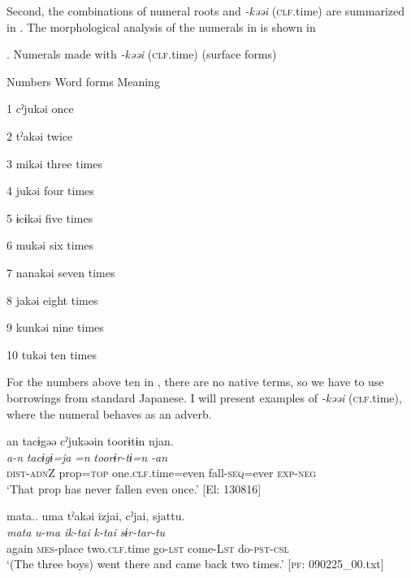 Second, the combinations of numeral roots and \textit{{}-kəəi} (\textsc{clf}.time) are summarized in . The morphological analysis of the numerals in  is shown in 

\begin{styleBeschriftung}
\textmd{}\textmd{. Numerals made with}\textmd{ \textit{-kəəi}}\textmd{ (\textsc{clf}.time) (surface forms)}
\end{styleBeschriftung}

Numbers  Word forms  Meaning

1  cˀjukəi  once

2  tˀakəi  twice

3  mikəi  three times

4  jukəi  four times

5  ɨcɨkəi  five times

6  mukəi  six times

7  nanakəi  seven times

8  jakəi  eight times

9  kunkəi  nine times

10  tukəi  ten times

For the numbers above ten in , there are no native terms, so we have to use borrowings from standard Japanese. I will present examples of \textit{{}-kəəi} (\textsc{clf}.time), where the numeral behaves as an adverb.

\ea \label{ex:7:13}
\ea \label{ex:7:13a}%
\glll  an  tacɨgəə  cˀjukəəin  toorɨtɨn  njan.\\
\textit{a-n}  \textit{tacɨgɨ=ja}  \textit{=n}  \textit{toorɨr-tɨ=n}  \textit{-an}\\
\textsc{dist}-\textsc{adn}Z  prop=\textsc{top}  one.\textsc{clf}.time=even  fall-\textsc{seq}=ever  \textsc{exp}-\textsc{neg}\\
\glt ‘That prop has never fallen even once.’ [El: 130816]

\ex \label{ex:7:13b}%
\glll  mata..  uma  tˀakəi  izjai,  cˀjai,  sjattu.\\
\textit{mata}  \textit{u-ma}  \textit{}  \textit{ik-tai}  \textit{k-tai}  \textit{sɨr-tar-tu}\\
again  \textsc{mes}-place  two.\textsc{clf}.time  go-\textsc{lst}  come-L\textsc{st}  do-\textsc{pst}-\textsc{csl}\\
\glt ‘(The three boys) went there and came back two times.’ [\textsc{pf}: 090225\_00.txt]
\z
\z

